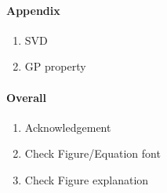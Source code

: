\documentclass[a4paper,10pt]{article}
\begin{document}
\paragraph{Appendix}
\begin{enumerate}
 \item SVD
 \item GP property
\end{enumerate}

\paragraph{Overall}
\begin{enumerate}
 \item Acknowledgement 
 \item Check Figure/Equation font
 \item Check Figure explanation
\end{enumerate}
\end{document}
